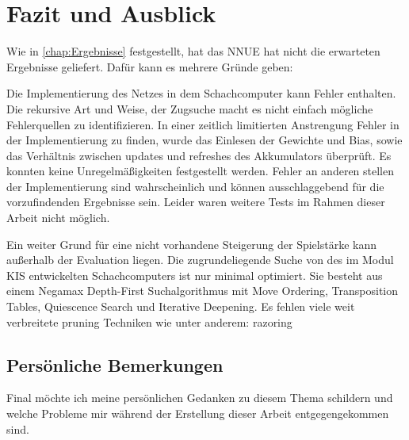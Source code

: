 \chapter{Fazit und Ausblick}

Wie in \autoref{chap:Ergebnisse} festgestellt, hat das \ac{NNUE} hat nicht die erwarteten Ergebnisse geliefert. Dafür kann es mehrere Gründe geben:

Die Implementierung des Netzes in dem Schachcomputer kann Fehler enthalten. Die rekursive Art und Weise, der Zugsuche macht es nicht einfach mögliche Fehlerquellen zu identifizieren. In einer zeitlich limitierten Anstrengung Fehler in der Implementierung zu finden, wurde das Einlesen der Gewichte und Bias, sowie das Verhältnis zwischen updates und refreshes des Akkumulators überprüft. Es konnten keine Unregelmäßigkeiten festgestellt werden. Fehler an anderen stellen der Implementierung sind wahrscheinlich und können ausschlaggebend für die vorzufindenden Ergebnisse sein. Leider waren weitere Tests im Rahmen dieser Arbeit nicht möglich.

Ein weiter Grund für eine nicht vorhandene Steigerung der Spielstärke kann außerhalb der Evaluation liegen. Die zugrundeliegende Suche von des im Modul \ac{KIS} entwickelten Schachcomputers ist nur minimal optimiert. Sie besteht aus einem Negamax Depth-First Suchalgorithmus \cite{Campbell1983} mit Move Ordering, Transposition Tables, Quiescence Search und Iterative Deepening. Es fehlen viele weit verbreitete pruning Techniken wie unter anderem: razoring \cite[S. 123-128]{Levy1988}



\section{Persönliche Bemerkungen}
Final möchte ich meine persönlichen Gedanken zu diesem Thema schildern und welche Probleme mir während der Erstellung dieser Arbeit entgegengekommen sind.